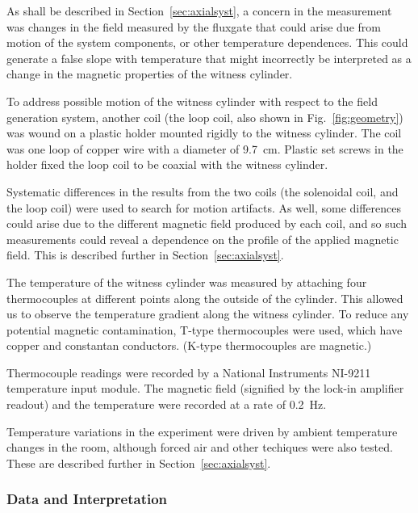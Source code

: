 As shall be described in Section~\ref{sec:axialsyst}, a concern in the
measurement was changes in the field measured by the fluxgate that
could arise due from motion of the system components, or other
temperature dependences.  This could generate a false slope with
temperature that might incorrectly be interpreted as a change in the
magnetic properties of the witness cylinder.

To address possible motion of the witness cylinder with respect to the
field generation system, another coil (the loop coil, also shown in
Fig.~\ref{fig:geometry}) was wound on a plastic holder mounted rigidly
to the witness cylinder.  The coil was one loop of copper wire with a
diameter of 9.7~cm.  Plastic set screws in the holder fixed the loop
coil to be coaxial with the witness cylinder.

Systematic differences in the results from the two coils (the
solenoidal coil, and the loop coil) were used to search for motion
artifacts.  As well, some differences could arise due to the different
magnetic field produced by each coil, and so such measurements could
reveal a dependence on the profile of the applied magnetic field.
This is described further in Section~\ref{sec:axialsyst}.

The temperature of the witness cylinder was measured by attaching four
thermocouples at different points along the outside of the cylinder.
This allowed us to observe the temperature gradient along the witness
cylinder.  To reduce any potential magnetic contamination, T-type
thermocouples were used, which have copper and constantan conductors.
(K-type thermocouples are magnetic.)

Thermocouple readings were recorded by a National Instruments NI-9211
temperature input module.  The magnetic field (signified by the
lock-in amplifier readout) and the temperature were recorded at a rate
of 0.2~Hz.

Temperature variations in the experiment were driven by ambient
temperature changes in the room, although forced air and other
techiques were also tested.  These are described further in
Section~\ref{sec:axialsyst}.


\subsubsection{Data and Interpretation\label{sec:axialsyst}}

